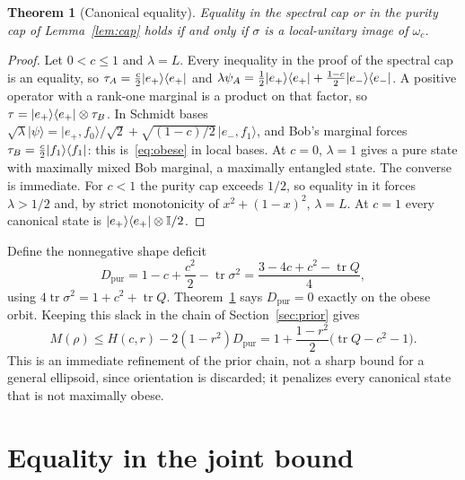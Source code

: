 \documentclass[11pt]{article}
\newtheorem{theorem}{Theorem}[section]
\theoremstyle{remark}\newtheorem{remark}[theorem]{Remark}
\DeclareMathOperator{\tr}{tr}\DeclareMathOperator{\diag}{diag}
\newcommand{\id}{\mathbb I}\newcommand{\ket}[1]{|#1\rangle}
\newcommand{\Dp}{D_{\mathrm{pur}}}
\begin{document}
\begin{theorem}[Canonical equality]\label{thm:canonical-equality}
Equality in the spectral cap or in the purity cap of Lemma~\ref{lem:cap} holds
if and only if $\sigma$ is a local-unitary image of $\omega_c$.
\end{theorem}
\begin{proof}
Let $0<c\le1$ and $\lambda=L$. Every inequality in the proof of the spectral
cap is an equality, so $\tau_A=\frac c2\proj{e_+}$ and
$\lambda\psi_A=\frac12\proj{e_+}+\frac{1-c}2\proj{e_-}$. A positive operator
with a rank-one marginal is a product on that factor, so
$\tau=\proj{e_+}\otimes\tau_B$. In Schmidt bases
$\sqrt\lambda\ket\psi=\ket{e_+,f_0}/\sqrt2+\sqrt{(1-c)/2}\,\ket{e_-,f_1}$, and
Bob's marginal forces $\tau_B=\frac c2\proj{f_1}$: this is~\eqref{eq:obese}
in local bases. At $c=0$, $\lambda=1$ gives a pure state with maximally mixed
Bob marginal, a maximally entangled state. The converse is immediate. For
$c<1$ the purity cap exceeds $1/2$, so equality in it forces $\lambda>1/2$ and,
by strict monotonicity of $x^2+(1-x)^2$, $\lambda=L$. At $c=1$ every canonical
state is $\proj{e_+}\otimes\id/2$.
\end{proof}

Define the nonnegative shape deficit
\begin{equation}\label{eq:D}
 \Dp=1-c+\frac{c^2}2-\tr\sigma^2=\frac{3-4c+c^2-\tr Q}{4},
\end{equation}
using $4\tr\sigma^2=1+c^2+\tr Q$. Theorem~\ref{thm:canonical-equality} says
$\Dp=0$ exactly on the obese orbit. Keeping this slack in the chain of
Section~\ref{sec:prior} gives
\begin{equation}\label{eq:shape-gap}
 M(\rho)\le H(c,r)-2(1-r^2)\Dp=1+\frac{1-r^2}{2}\bigl(\tr Q-c^2-1\bigr).
\end{equation}
This is an immediate refinement of the prior chain, not a sharp bound for a
general ellipsoid, since orientation is discarded; it penalizes every
canonical state that is not maximally obese.

\section{Equality in the joint bound}\label{sec:joint}
\end{document}
